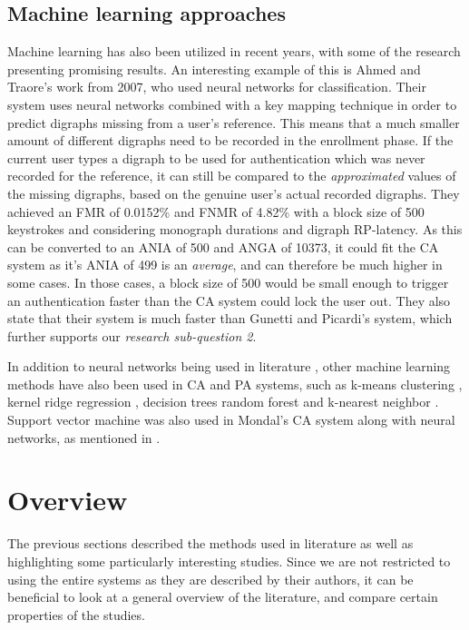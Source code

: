 \subsection{Machine learning approaches}
Machine learning has also been utilized in recent years, with some of the research presenting promising results.
An interesting example of this is Ahmed and Traore's \cite{Ahmed} work from 2007, who used neural networks for classification.
Their system uses neural networks combined with a key mapping technique in order to predict digraphs missing from a user's reference.
This means that a much smaller amount of different digraphs need to be recorded in the enrollment phase.
If the current user types a digraph to be used for authentication which was never recorded for the reference, it can still be compared to the \textit{approximated} values of the missing digraphs, based on the genuine user's actual recorded digraphs.
They achieved an FMR of 0.0152\% and FNMR of 4.82\% with a block size of 500 keystrokes and considering monograph durations and digraph RP-latency.
As this can be converted to an ANIA of 500 and ANGA of 10373, it could fit the CA system as it's ANIA of 499 is an \textit{average}, and can therefore be much higher in some cases.
In those cases, a block size of 500 would be small enough to trigger an authentication faster than the CA system could lock the user out.
They also state that their system is much faster than Gunetti and Picardi's system, which further supports our \textit{research sub-question 2}.

In addition to neural networks being used in literature \cite{Ahmed, Harun, mondal},
other machine learning methods have also been used in CA and PA systems, such as k-means clustering \cite{KIM2017, Solami}, kernel ridge regression \cite{900words}, decision trees \cite{alsultan} random forest \cite{fast} and k-nearest neighbor \cite{hu, monaco, KANG201572, stewart, Tappert}.
Support vector machine was also used in Mondal's \cite{mondal} CA system along with neural networks, as mentioned in .



\section{Overview}
\label{sec:related-overview}
The previous sections described the methods used in literature as well as highlighting some particularly interesting studies.
Since we are not restricted to using the entire systems as they are described by their authors, it can be beneficial to look at a general overview of the literature, and compare certain properties of the studies.

